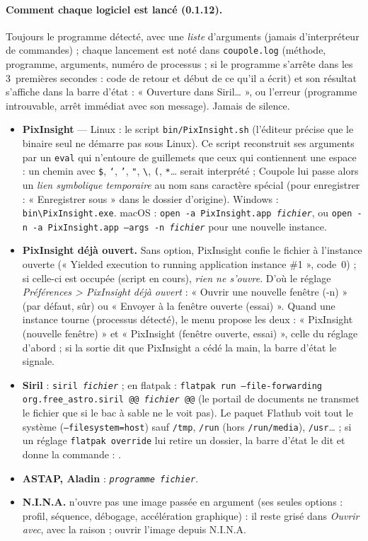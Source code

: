 \paragraph{Comment chaque logiciel est lancé (0.1.12).} Toujours le programme détecté, avec une \emph{liste}
d'arguments (jamais d'interpréteur de commandes) ; chaque lancement est noté dans \texttt{coupole.log} (méthode,
programme, arguments, numéro de processus ; si le programme s'arrête dans les 3~premières secondes : code de retour
et début de ce qu'il a écrit) et son résultat s'affiche dans la barre d'état : « Ouverture dans Siril… », ou
l'erreur (programme introuvable, arrêt immédiat avec son message). Jamais de silence.
\begin{itemize}
  \item \textbf{PixInsight} — Linux : le script \texttt{bin/PixInsight.sh} (l'éditeur précise que le binaire seul
  ne démarre pas sous Linux). Ce script reconstruit ses arguments par un \texttt{eval} qui n'entoure de guillemets
  que ceux qui contiennent une espace : un chemin avec \texttt{\$}, \texttt{`}, \texttt{'}, \texttt{"},
  \texttt{\textbackslash}, \texttt{(}, \texttt{*}… serait interprété ; Coupole lui passe alors un \emph{lien
  symbolique temporaire} au nom sans caractère spécial (pour enregistrer : « Enregistrer sous » dans le dossier
  d'origine). Windows : \texttt{bin\textbackslash PixInsight.exe}. macOS : \texttt{open -a PixInsight.app
  \emph{fichier}}, ou \texttt{open -n -a PixInsight.app --args -n \emph{fichier}} pour une nouvelle instance.
  \item \textbf{PixInsight déjà ouvert.} Sans option, PixInsight confie le fichier à l'instance ouverte (« Yielded
  execution to running application instance \#1 », code~0) ; si celle-ci est occupée (script en cours), \emph{rien
  ne s'ouvre}. D'où le réglage \emph{Préférences > PixInsight déjà ouvert} : « Ouvrir une nouvelle fenêtre (-n) »
  (par défaut, sûr) ou « Envoyer à la fenêtre ouverte (essai) ». Quand une instance tourne (processus détecté), le
  menu propose les deux : « PixInsight (nouvelle fenêtre) » et « PixInsight (fenêtre ouverte, essai) », celle du
  réglage d'abord ; si la sortie dit que PixInsight a cédé la main, la barre d'état le signale.
  \item \textbf{Siril} : \texttt{siril \emph{fichier}} ; en flatpak : \texttt{flatpak run --file-forwarding
  org.free\_astro.siril @@ \emph{fichier} @@} (le portail de documents ne transmet le fichier que si le bac à sable ne
  le voit pas). Le paquet Flathub voit tout le système (\texttt{--filesystem=host}) sauf \texttt{/tmp}, \texttt{/run}
  (hors \texttt{/run/media}), \texttt{/usr}… ; si un réglage \texttt{flatpak override} lui retire un dossier, la
  barre d'état le dit et donne la commande : .
  \item \textbf{ASTAP, Aladin} : \texttt{\emph{programme} \emph{fichier}}.
  \item \textbf{N.I.N.A.} n'ouvre pas une image passée en argument (ses seules options : profil, séquence, débogage,
  accélération graphique) : il reste grisé dans \emph{Ouvrir avec}, avec la raison ; ouvrir l'image depuis N.I.N.A.
\end{itemize}

